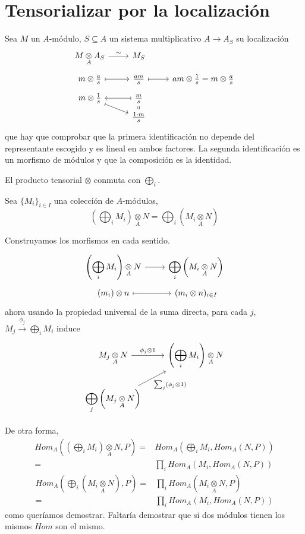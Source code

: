\section{Tensorializar por la localizaci\'on}
Sea $M$ un $A$-m\'odulo, $S\subseteq A$ un sistema multiplicativo $A \longrightarrow A_S$ su localizaci\'on
$$\bt M \underset{A}{\otimes} A_S \arrow{r}{\sim} & M_S \\[-5mm] m \otimes \frac{a}{s} \arrow[mapsto]{r} & \frac{am}{s} \arrow[mapsto]{r} & am \otimes \frac{1}{s} = m \otimes \frac{a}{s} \\[-5mm] m \otimes \frac{1}{s} \arrow[mapsto]{dr}& \arrow[mapsto]{l} \frac{m}{s}  \arrow[equal]{d} \\[-5mm] & \frac{1\cdot m}{s} & \et$$
que hay que comprobar que la primera identificaci\'on no depende del representante escogido y es lineal en ambos factores. La segunda identificaci\'on es un morfismo de m\'odulos y que la composici\'on es la identidad.
\begin{propi}
    El producto tensorial $\otimes$ conmuta con $\displaystyle \bigoplus_i$.

    Sea $\{M_i\}_{i \in I}$ una colecci\'on de $A$-m\'odulos, 
    $$\left( \bigoplus_i M_i \right) \underset{A}{\otimes} N = \bigoplus_i \left( M_i \underset{A}{\otimes} N \right)$$
\end{propi}
\begin{dem}
    Construyamos los morfismos en cada sentido.
    $$\bt \displaystyle \left( \bigoplus_i M_i \right) \underset{A}{\otimes} N \arrow{r} & \displaystyle \bigoplus_i \left( M_i \underset{A}{\otimes} N \right)\\[-5mm] (m_i) \otimes n \arrow[mapsto]{r} & (m_i \otimes n)_{i \in I} \et$$
    ahora usando la propiedad universal de la suma directa, para cada $j$, $\displaystyle M_j \overset{\phi_j}{\longrightarrow}  \bigoplus_i M_i$ induce
    $$\bt M_j \underset{A}{\otimes} N \arrow{r}{\phi_j\otimes 1} &  \left( \displaystyle\bigoplus_i M_i \right)\underset{A}{\otimes} N \\
     \displaystyle \bigoplus_j \left( M_j \underset{A}{\otimes} N \right) \arrow{ru}[swap]{\sum_j (\phi_j \otimes 1)}
    \et$$

    De otra forma, 
    \begin{align*}
        Hom_A\left(  \left( \bigoplus_i M_i \right)\underset{A}{\otimes} N, P \right) = & Hom_A(\bigoplus_i M_i, Hom_A(N,P)) \\ = & \prod_i Hom_A(M_i, Hom_A(N,P)) 
    \end{align*}
    \begin{align*}
        Hom_A\left(  \bigoplus_i \left( M_i \underset{A}{\otimes} N\right), P \right) = & \prod_i Hom_A(M_i \underset{A}{\otimes} N ,P) \\ = &  \prod_i Hom_A(M_i , Hom_A( N ,P))  
    \end{align*} como quer\'iamos demostrar. Faltar\'ia demostrar que si dos m\'odulos tienen los mismos $Hom$ son el mismo.
\end{dem}
